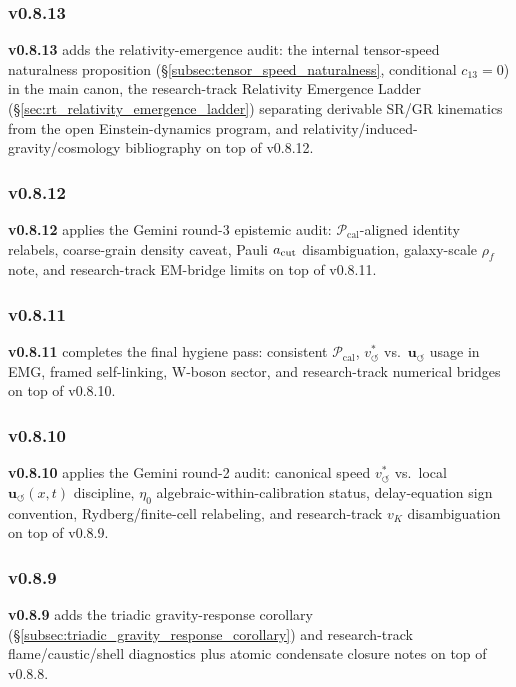 \documentclass[11pt]{article}
\theoremstyle{definition}
\theoremstyle{plain}
\theoremstyle{remark}
\newcommand{\rhoF}{{\rho_{\!f}}}
\newcommand{\vchar}{v_{\!\boldsymbol{\circlearrowleft}}^{\ast}}
\newcommand{\uswirl}{\mathbf{u}_{\!\boldsymbol{\circlearrowleft}}}
\begin{document}
        \subsubsection{v0.8.13}
            \textbf{v0.8.13} adds the relativity-emergence audit: the internal tensor-speed naturalness proposition (\S\ref{subsec:tensor_speed_naturalness}, conditional $c_{13}=0$) in the main canon, the research-track Relativity Emergence Ladder (\S\ref{sec:rt_relativity_emergence_ladder}) separating derivable SR/GR kinematics from the open Einstein-dynamics program, and relativity/induced-gravity/cosmology bibliography on top of v0.8.12.

        \subsubsection{v0.8.12}
            \textbf{v0.8.12} applies the Gemini round-3 epistemic audit: $\mathcal{P}_{\mathrm{cal}}$-aligned identity relabels, coarse-grain density caveat, Pauli $a_{\rm cut}$ disambiguation, galaxy-scale $\rhoF$ note, and research-track EM-bridge limits on top of v0.8.11.

        \subsubsection{v0.8.11}
            \textbf{v0.8.11} completes the final hygiene pass: consistent $\mathcal{P}_{\mathrm{cal}}$, $\vchar$ vs.\ $\uswirl$ usage in EMG, framed self-linking, W-boson sector, and research-track numerical bridges on top of v0.8.10.

        \subsubsection{v0.8.10}
            \textbf{v0.8.10} applies the Gemini round-2 audit: canonical speed $\vchar$ vs.\ local $\uswirl(x,t)$ discipline, $\eta_0$ algebraic-within-calibration status, delay-equation sign convention, Rydberg/finite-cell relabeling, and research-track $v_K$ disambiguation on top of v0.8.9.

        \subsubsection{v0.8.9}
            \textbf{v0.8.9} adds the triadic gravity-response corollary (\S\ref{subsec:triadic_gravity_response_corollary}) and research-track flame/caustic/shell diagnostics plus atomic condensate closure notes on top of v0.8.8.
\end{document}

